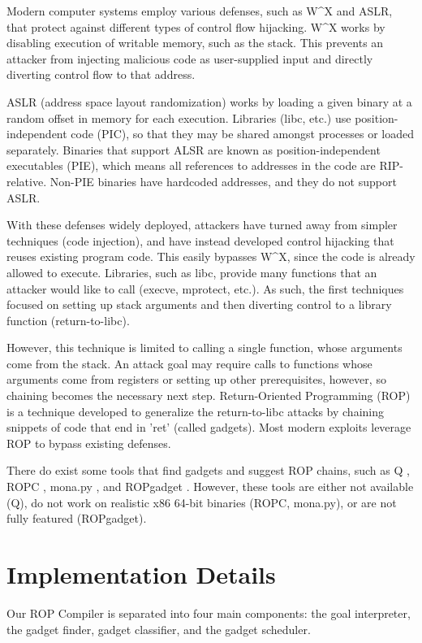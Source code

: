 \documentclass[journal]{IEEEtran}
\begin{document}
Modern computer systems employ various defenses, such as W\^{}X and ASLR, that
protect against different types of control flow hijacking. W\^{}X works by
disabling execution of writable memory, such as the stack. This prevents an
attacker from injecting malicious code as user-supplied input and directly
diverting control flow to that address.

ASLR (address space layout randomization) works by loading a given binary at a random offset in memory for
each execution. Libraries (libc, etc.) use position-independent code (PIC),
so that they may be shared amongst processes or loaded separately. Binaries that
support ALSR are known as position-independent executables (PIE), which means
all references to addresses in the code are RIP-relative. Non-PIE binaries have
hardcoded addresses, and they do not support ASLR.



With these defenses widely deployed, attackers have turned away from simpler
techniques (code injection), and have instead developed control hijacking that
reuses existing program code. This easily bypasses W\^{}X, since the code is
already allowed to execute. Libraries, such as libc, provide many functions that
an attacker would like to call (execve, mprotect, etc.). As such, the first
techniques focused on setting up stack arguments and then diverting control to a
library function (return-to-libc).

However, this technique is limited to calling a single function, whose arguments
come from the stack. An attack goal may require calls to functions whose
arguments come from registers or setting up other prerequisites, however, so
chaining becomes the necessary next step. Return-Oriented Programming (ROP) \cite{rop} is a
technique developed to generalize the return-to-libc attacks by chaining
snippets of code that end in 'ret' (called gadgets). Most modern exploits leverage ROP to bypass existing defenses.

There do exist some tools that find gadgets and suggest ROP chains, such as Q \cite{schwartz2011q},
ROPC \cite{ropc}, mona.py \cite{mona}, and ROPgadget \cite{ropgadget}. However, these tools are either not available (Q),
do not work on realistic x86 64-bit binaries (ROPC, mona.py), or are not fully
featured (ROPgadget).


\section{Implementation Details}
Our ROP Compiler is separated into four main components: the goal interpreter, the gadget finder, gadget classifier, and the gadget scheduler.
\end{document}
